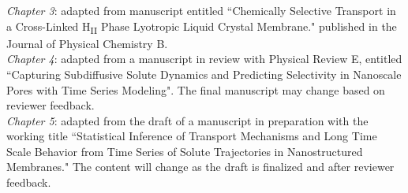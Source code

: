   \noindent\textit{Chapter 3}: adapted from manuscript entitled ``Chemically Selective 
  Transport in a Cross-Linked H\textsubscript{II} Phase Lyotropic Liquid Crystal Membrane."
  published in the Journal of Physical Chemistry B.~\cite{coscia_chemically_2019} \\
    
  \noindent\textit{Chapter 4}: adapted from a manuscript in review with Physical Review E, entitled 
  ``Capturing Subdiffusive Solute Dynamics and Predicting Selectivity in Nanoscale Pores
  with Time Series Modeling". The final manuscript may change based on reviewer feedback. \\
    
  \noindent\textit{Chapter 5}: adapted from the draft of a manuscript in preparation with the working
  title ``Statistical Inference of Transport Mechanisms and Long Time Scale Behavior from Time Series 
  of Solute Trajectories in Nanostructured Membranes." The content will change as the
  draft is finalized and after reviewer feedback.
  
